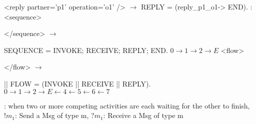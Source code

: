 <reply partner='p1' operation='o1' />  $\rightarrow$ REPLY = (reply\_p1\_o1-> END).
:
<sequence>
\begin{CJK*}{UTF8}{gbsn}
\end{CJK*}
</sequence> 
$\rightarrow$
\begin{CJK*}{UTF8}{gbsn}
\end{CJK*}
SEQUENCE = INVOKE; RECEIVE; REPLY; END. 
$0 \rightarrow 1\rightarrow 2 \rightarrow E$
<flow>
\begin{CJK*}{UTF8}{gbsn}
\end{CJK*}
</flow>
$\rightarrow$
\begin{CJK*}{UTF8}{gbsn}
\end{CJK*}
|| FLOW = (INVOKE || RECEIVE || REPLY).
$0 \rightarrow 1\rightarrow 2 \rightarrow E \leftarrow 4 \leftarrow 5 \leftarrow 6 \leftarrow 7$
\begin{CJK*}{UTF8}{gbsn}
\end{CJK*}
\textbar
{}:
when two or more competing activities are each waiting for the other to finish,
$!m_1$: Send a Msg of type m,
$?m_1$: Receive a Msg of type m

